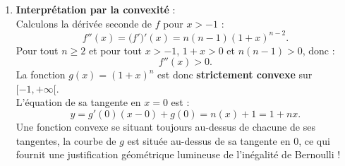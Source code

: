 \documentclass[11pt,a4paper]{article}
\begin{document}
\begin{correctionbox}
\begin{enumerate}[label=\textbf{\arabic*.}]
\begin{enumerate}[label=\alph*.]
        \item \textbf{Cas où $n$ est impair ($n \ge 3$)} :\\
        Soit $x \in [-2, -1]$. Posons $t = -(1+x)$.\\
        Puisque $-2 \le x \le -1$, on a $-1 \le 1+x \le 0$, d'où $0 \le t \le 1$.\\
        Exprimons chaque terme en fonction de $t$ :
        \begin{itemize}
            \item $1+x = -t \implies (1+x)^n = (-t)^n = (-1)^n t^n = -t^n$ car $n$ est impair.
            \item $x = -1 - t \implies 1 + nx = 1 + n(-1 - t) = 1 - n - nt$.
        \end{itemize}
        L'inégalité $(1+x)^n \ge 1+nx$ équivaut donc à :
        \[
        -t^n \ge 1 - n - nt \iff (n - 1) + nt - t^n \ge 0.
        \]
        Or, pour tout $t \in [0, 1]$ et $n \ge 3$ :
        \begin{itemize}
            \item $t^n \le t \le nt \implies nt - t^n \ge 0$ ;
            \item $n \ge 3 \implies n - 1 \ge 2 > 0$.
        \end{itemize}
        Par conséquent :
        \[
        (n - 1) + nt - t^n \ge 2 + 0 = 2 > 0.
        \]
        L'inégalité est donc encore strictement vérifiée pour tout $x \in [-2, -1]$.\\
        \textbf{Conclusion générale} : Pour tout entier $n \ge 2$ et pour tout $x \in [-2, +\infty[$, on a bien $(1+x)^n \ge 1+nx$.
    \end{enumerate}

    \item \textbf{Interprétation par la convexité} :\\
    Calculons la dérivée seconde de $f$ pour $x > -1$ :
    \[
    f''(x) = \big(f'\big)'(x) = n(n-1)(1+x)^{n-2}.
    \]
    Pour tout $n \ge 2$ et pour tout $x > -1$, $1+x > 0$ et $n(n-1) > 0$, donc :
    \[
    f''(x) > 0.
    \]
    La fonction $g(x) = (1+x)^n$ est donc \textbf{strictement convexe} sur $[-1, +\infty[$.\\
    L'équation de sa tangente en $x = 0$ est :
    \[
    y = g'(0)(x - 0) + g(0) = n(x) + 1 = 1 + nx.
    \]
    Une fonction convexe se situant toujours au-dessus de chacune de ses tangentes, la courbe de $g$ est située au-dessus de sa tangente en $0$, ce qui fournit une justification géométrique lumineuse de l'inégalité de Bernoulli !
\end{enumerate}
\end{correctionbox}
\end{document}
